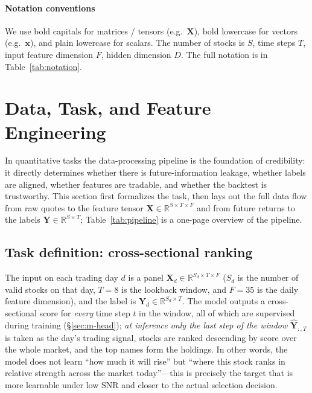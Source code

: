 \documentclass[a4paper,11pt]{article}
\begin{document}
\paragraph{Notation conventions}
We use bold capitals for matrices / tensors (e.g.\ $\bm{X}$), bold lowercase for
vectors (e.g.\ $\bm{x}$), and plain lowercase for scalars. The number of stocks
is $S$, time steps $T$, input feature dimension $F$, hidden dimension $D$. The
full notation is in Table~\ref{tab:notation}.

\section{Data, Task, and Feature Engineering}\label{sec:data}
In quantitative tasks the data-processing pipeline is the foundation of
credibility: it directly determines whether there is future-information
leakage, whether labels are aligned, whether features are tradable, and whether
the backtest is trustworthy. This section first formalizes the task, then lays
out the full data flow from raw quotes to the feature tensor
$\bm{X}\in\mathbb{R}^{S\times T\times F}$ and from future returns to the labels
$\bm{Y}\in\mathbb{R}^{S\times T}$; Table~\ref{tab:pipeline} is a one-page
overview of the pipeline.

\subsection{Task definition: cross-sectional ranking}\label{sec:data-task}
The input on each trading day $d$ is a panel
$\bm{X}_d\in\mathbb{R}^{S_d\times T\times F}$ ($S_d$ is the number of valid
stocks on that day, $T{=}8$ is the lookback window, and $F{=}35$ is the daily
feature dimension), and the label is
$\bm{Y}_d\in\mathbb{R}^{S_d\times T}$. The model outputs a cross-sectional
score for \emph{every} time step $t$ in the window, all of which are supervised
during training (\S\ref{sec:m-head}); \emph{at inference only the last step of
the window} $\hat{\bm{Y}}_{:,T}$ is taken as the day's trading signal, stocks
are ranked descending by score over the whole market, and the top names form
the holdings. In other words, the model does not learn ``how much it will
rise'' but ``where this stock ranks in relative strength across the market
today''---this is precisely the target that is more learnable under low SNR
and closer to the actual selection decision.
\end{document}
